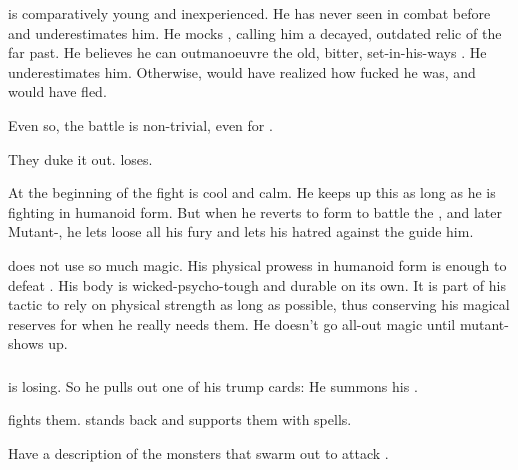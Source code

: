 \begin{garbage}
\Teshrial{} is comparatively young and inexperienced. 
He has never seen \Ishnaruchaefir{} in combat before and underestimates him. 
He mocks \Ishnaruchaefir, calling him a decayed, outdated relic of the far past. 
He believes he can outmanoeuvre the old, bitter, set-in-his-ways \shaeeroth.
He underestimates him. 
Otherwise, \Teshrial{} would have realized how fucked he was, and would have fled. 

Even so, the battle is non-trivial, even for \Ishnaruchaefir. 

They duke it out. 
\Teshrial{} loses. 

At the beginning of the fight \Ishnaruchaefir{} is cool and calm. 
He keeps up this \facade{} as long as he is fighting in humanoid form. 
But when he reverts to \draconian{} form to battle the \ghobaleth{}, and later Mutant-\Teshrial, he lets loose all his \draconian{} fury and lets his hatred against the \resphain{} guide him. 

\Ishnaruchaefir{} does not use so much magic. 
His physical prowess in humanoid form is enough to defeat \Teshrial{}. 
His body is wicked-psycho-tough and durable on its own. 
It is part of his tactic to rely on physical strength as long as possible, thus conserving his magical reserves for when he really needs them. 
He doesn't go all-out magic until mutant-\Teshrial{} shows up. 





\subsubsection{\Ghobaleth}
\Teshrial{} is losing. 
So he pulls out one of his trump cards: 
He summons his \ghobaleth. 

\Ishnaruchaefir{} fights them. 
\Teshrial{} stands back and supports them with spells. 

Have a description of the monsters that swarm out to attack \Ishna. 



\end{garbage}
